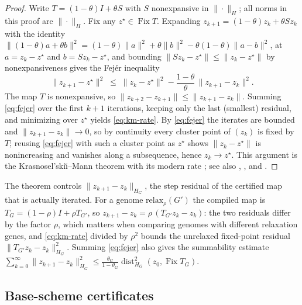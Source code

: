 \begin{proof}
Write $T=(1-\theta)I+\theta S$ with $S$ nonexpansive in $\|\cdot\|_H$; all
norms in this proof are $\|\cdot\|_H$. Fix any
$z^\star\in\operatorname{Fix}T$. Expanding $z_{k+1}=(1-\theta)z_k+\theta
Sz_k$ with the identity
$\|(1-\theta)a+\theta b\|^2=(1-\theta)\|a\|^2+\theta\|b\|^2
-\theta(1-\theta)\|a-b\|^2$, at $a=z_k-z^\star$ and $b=Sz_k-z^\star$, and
bounding $\|Sz_k-z^\star\|\leq\|z_k-z^\star\|$ by nonexpansiveness gives the
Fej\'er inequality
\begin{equation}
 \|z_{k+1}-z^\star\|^2
 \;\leq\;
 \|z_k-z^\star\|^2-\frac{1-\theta}{\theta}\,\|z_{k+1}-z_k\|^2 .
 \label{eq:fejer}
\end{equation}
The map $T$ is nonexpansive, so
$\|z_{k+2}-z_{k+1}\|\leq\|z_{k+1}-z_k\|$. Summing \eqref{eq:fejer} over the
first $k+1$ iterations, keeping only the last (smallest) residual, and
minimizing over $z^\star$ yields \eqref{eq:km-rate}. By \eqref{eq:fejer} the
iterates are bounded and $\|z_{k+1}-z_k\|\to0$, so by continuity every
cluster point of $(z_k)$ is fixed by $T$; reusing \eqref{eq:fejer} with such
a cluster point as $z^\star$ shows $\|z_k-z^\star\|$ is nonincreasing and
vanishes along a subsequence, hence $z_k\to z^\star$. This argument is the
Krasnosel'ski\u{\i}--Mann theorem with its modern rate
\citep[Theorem~1]{RyuYin2022LargeScale}; see also
\citet{Krasnoselskii1955Two}, \citet{Mann1953Mean}, and
\citet{BauschkeCombettes2017Convex}.
\end{proof}

\begin{remark}
\label{rem:monitored-residual}
The theorem controls $\|z_{k+1}-z_k\|_{H_G}$, the step residual of the
certified map that is actually iterated. For a genome
$\mathrm{relax}_\rho(G')$ the compiled map is
$T_G=(1-\rho)I+\rho T_{G'}$, so
$z_{k+1}-z_k=\rho\,(T_{G'}z_k-z_k)$: the two residuals differ by the factor
$\rho$, which matters when comparing genomes with different relaxation genes,
and \eqref{eq:km-rate} divided by $\rho^2$ bounds the unrelaxed fixed-point
residual $\|T_{G'}z_k-z_k\|_{H_G}^2$. Summing \eqref{eq:fejer} also gives the
summability estimate
$\sum_{k=0}^{\infty}\|z_{k+1}-z_k\|_{H_G}^2\leq
\frac{\theta_G}{1-\theta_G}\operatorname{dist}_{H_G}^2
(z_0,\operatorname{Fix}T_G)$.
\end{remark}

\subsection{Base-scheme certificates}

